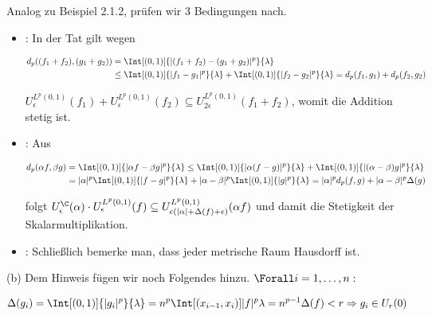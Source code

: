 \begin{solution}
\begin{enumerate}[label = (\roman*)]
\end{enumerate}

Analog zu Beispiel 2.1.2, prüfen wir 3 Bedingungen nach.

\begin{itemize}

  \item
  :
  In der Tat gilt wegen

  \begin{align*}
    d_p((f_1 + f_2), (g_1 + g_2))
    & =
    \Int[(0, 1)]{|(f_1 + f_2) - (g_1 + g_2)|^p}{\lambda} \\
    & \leq
    \Int[(0, 1)]{|f_1  - g_1|^p}{\lambda} +
    \Int[(0, 1)]{|f_2  - g_2|^p}{\lambda}
    =
    d_p(f_1, g_1) + d_p(f_2, g_2)
  \end{align*}

  $U_\epsilon^{L^p(0, 1)}(f_1) + U_\epsilon^{L^p(0, 1)}(f_2) \subseteq U_{2 \epsilon}^{L^p(0, 1)}(f_1 + f_2)$, womit die Addition stetig ist.

  \item
  :
  Aus

  \begin{align*}
    d_p(\alpha f, \beta g)
    & =
    \Int[(0, 1)]{|\alpha f - \beta g|^p}{\lambda}
    \leq
    \Int[(0, 1)]{|\alpha (f - g)|^p}{\lambda} +
    \Int[(0, 1)]{|(\alpha - \beta) g|^p}{\lambda} \\
    & =
    |\alpha|^p
    \Int[(0, 1)]{|f - g|^p}{\lambda} +
    |\alpha - \beta|^p
    \Int[(0, 1)]{|g|^p}{\lambda}
    =
    |\alpha|^p
    d_p(f, g) +
    |\alpha - \beta|^p
    \Delta(g)
  \end{align*}

  folgt $U_\epsilon^\C(\alpha) \cdot U_\epsilon^{L^p(0, 1)}(f) \subseteq U_{\epsilon (|\alpha| + \Delta(f) + \epsilon)}^{L^p(0, 1)}(\alpha f)$ und damit die Stetigkeit der Skalarmultiplikation.

  \item
  :
  Schließlich bemerke man, dass jeder metrische Raum Hausdorff ist.

\end{itemize}

(b)
Dem Hinweis fügen wir noch Folgendes hinzu. $\Forall i = 1, \ldots, n:$

\begin{align*}
  \Delta(g_i)
  =
  \Int[(0, 1)]{|g_i|^p}{\lambda}
  =
  n^p
  \Int[(x_{i-1}, x_i)]{|f|^p}{\lambda}
  =
  n^{p-1} \Delta(f) < r
  \Rightarrow
  g_i \in U_r(0)
\end{align*}


\end{solution}
